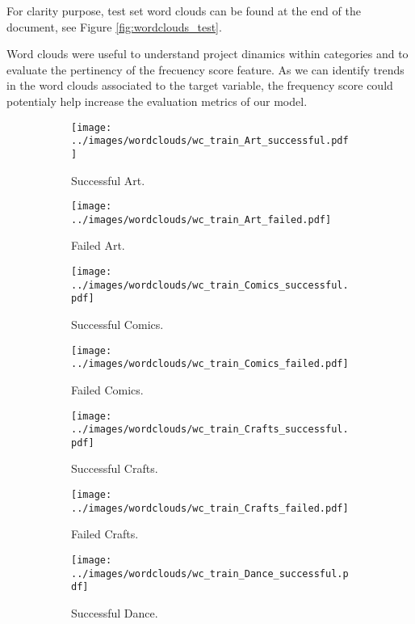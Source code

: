 \documentclass{article}
\begin{document}
\begin{itemize}
For clarity purpose, test set word clouds can be found at the end of the document, see Figure \ref{fig:wordclouds_test}.

Word clouds were useful to understand project dinamics within categories and to evaluate the pertinency of the frecuency score feature. As we can identify trends in the word clouds associated to the target variable, the frequency score could potentialy help increase the evaluation metrics of our model.

\begin{figure}
  \begin{subfigure}[a]{0.2\linewidth}
    \centering\texttt{[image: ../images/wordclouds/wc\_train\_Art\_successful.pdf]}
    \caption{Successful Art.}
    \label{fig:Art_s}
  \end{subfigure}
  \begin{subfigure}[a']{0.2\linewidth}
    \centering\texttt{[image: ../images/wordclouds/wc\_train\_Art\_failed.pdf]}
    \caption{Failed Art.}
    \label{fig:Art_f}
  \end{subfigure}
  \begin{subfigure}[b]{0.2\linewidth}
    \centering\texttt{[image: ../images/wordclouds/wc\_train\_Comics\_successful.pdf]}
    \caption{Successful Comics.}
    \label{fig:Comic_s}
  \end{subfigure} 
  \begin{subfigure}[b']{0.2\linewidth}
    \centering\texttt{[image: ../images/wordclouds/wc\_train\_Comics\_failed.pdf]}
    \caption{Failed Comics.}
    \label{fig:Comic_f}
  \end{subfigure}
  \begin{subfigure}[c]{0.2\linewidth}
    \centering\texttt{[image: ../images/wordclouds/wc\_train\_Crafts\_successful.pdf]}
    \caption{Successful Crafts.}
    \label{fig:Crafts_s}
  \end{subfigure}
    \begin{subfigure}[c']{0.2\linewidth}
    \centering\texttt{[image: ../images/wordclouds/wc\_train\_Crafts\_failed.pdf]}
    \caption{Failed Crafts.}
    \label{fig:Crafts_f}
  \end{subfigure}
    \begin{subfigure}[d]{0.2\linewidth}
    \centering\texttt{[image: ../images/wordclouds/wc\_train\_Dance\_successful.pdf]}
    \caption{Successful Dance.}
    \label{fig:Dance_s}
  \end{subfigure}
    \begin{subfigure}[d']{0.2\linewidth}

\end{subfigure}
\end{figure}
\end{itemize}
\end{document}
